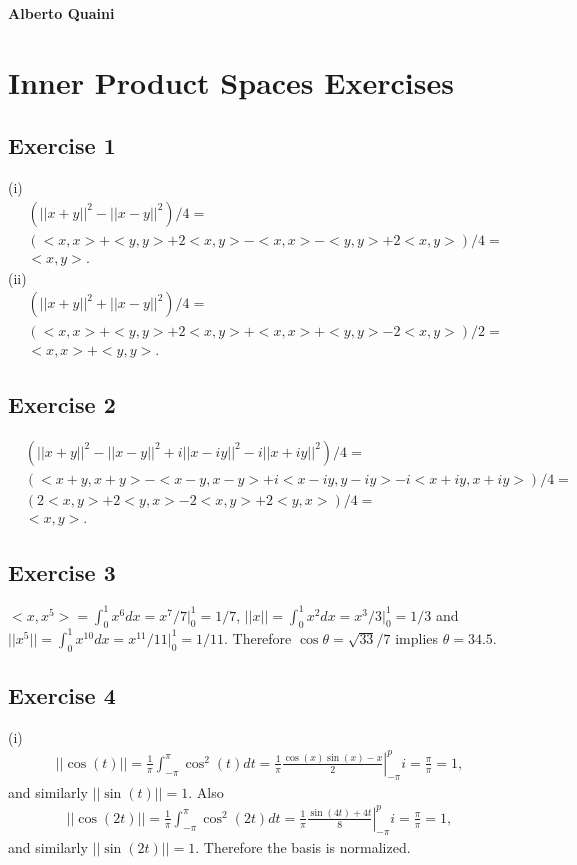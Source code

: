 \documentclass[11.5pt, letterpaper, bibtotoc,
    tablecaptionabove, figurecaptionabove]{article}
\begin{document}
\textbf{Alberto Quaini}

\section*{Inner Product Spaces Exercises}

\subsection{Exercise 1}
(i)
\begin{align*}
    &\left( ||x+y||^2 - ||x-y||^2 \right)/4=\\
    &\left( <x,x> + <y,y> + 2<x,y> - <x,x> - <y,y> + 2<x,y>\right)/4=\\
    &<x,y>.
\end{align*}
(ii)
\begin{align*}
    &\left( ||x+y||^2 + ||x-y||^2 \right) / 4 =\\
    &\left( <x,x> + <y,y> + 2<x,y> + <x,x> + <y,y> - 2<x,y>\right) / 2 =\\
    &<x,x> + <y,y>.
\end{align*}

\subsection{Exercise 2}
\begin{align*}
    &(||x+y||^2 - ||x-y||^2 + i||x-iy||^2 - i||x+iy||^2) / 4 =\\
    &(<x+y,x+y> - <x-y,x-y> + i<x-iy,y-iy> - i<x+iy,x+iy>) / 4 =\\ 
    &(2<x,y> + 2<y,x> -2<x,y> +2<y,x>) / 4=\\
    &<x,y>.
\end{align*}

\subsection{Exercise 3}
$<x,x^5> = \int_0^1x^6dx=x^7/7|_0^1=1/7$,
$||x|| = \int_0^1x^2dx=x^3/3|_0^1=1/3$ and
$||x^5|| = \int_0^1x^10dx=x^11/11|_0^1=1/11$.
Therefore $\cos\theta=\sqrt{33}/7$ implies $\theta=34.5$.

\subsection{Exercise 4}
(i)
\begin{align*}
    ||\cos(t)||=\frac{1}{\pi}\int_{-\pi}^\pi\cos^2(t)dt=
    \frac{1}{\pi}\left.\frac{\cos(x)\sin(x)-x}{2}\right\lvert_{-\pi}^pi=\frac{\pi}{\pi}=1,
\end{align*}
and similarly $||\sin(t)||=1$.
Also
\begin{align*}
    ||\cos(2t)||=\frac{1}{\pi}\int_{-\pi}^\pi\cos^2(2t)dt=
    \frac{1}{\pi}\left.\frac{\sin(4t)+4t}{8}\right\lvert_{-\pi}^pi=\frac{\pi}{\pi}=1,
\end{align*}
and similarly $||\sin(2t)||=1$.
Therefore the basis is normalized.
\end{document}

